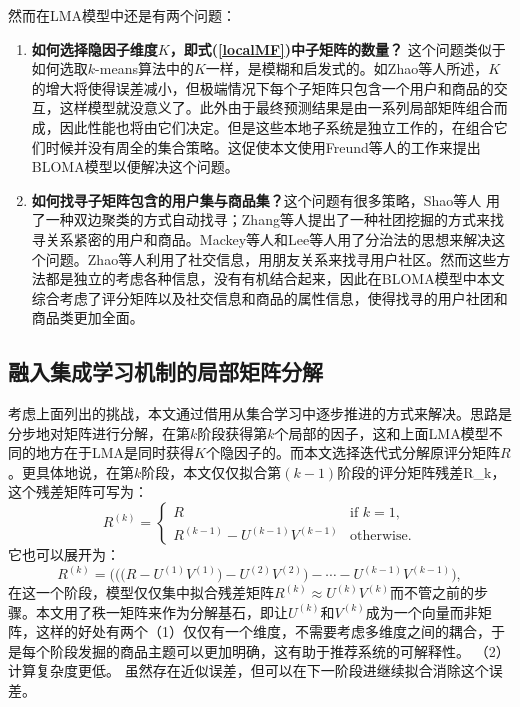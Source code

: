 然而在LMA模型中还是有两个问题：
\begin{enumerate}
\vspace{1.5mm}
\item \textbf{如何选择隐因子维度$K$，即式(\ref{localMF})中子矩阵的数量？} 这个问题类似于如何选取$k$-means算法中的$K$一样，是模糊和启发式的。如Zhao等人所述，$K$的增大将使得误差减小，但极端情况下每个子矩阵只包含一个用户和商品的交互，这样模型就没意义了。此外由于最终预测结果是由一系列局部矩阵组合而成，因此性能也将由它们决定。但是这些本地子系统是独立工作的，在组合它们时候并没有周全的集合策略。这促使本文使用Freund等人的工作来提出BLOMA模型以便解决这个问题。

\vspace{1.5mm}
\item \textbf{如何找寻子矩阵包含的用户集与商品集？}这个问题有很多策略，Shao等人 用了一种双边聚类的方式自动找寻；Zhang等人提出了一种社团挖掘的方式来找寻关系紧密的用户和商品。Mackey等人和Lee等人用了分治法的思想来解决这个问题。Zhao等人利用了社交信息，用朋友关系来找寻用户社区。然而这些方法都是独立的考虑各种信息，没有有机结合起来，因此在BLOMA模型中本文综合考虑了评分矩阵以及社交信息和商品的属性信息，使得找寻的用户社团和商品类更加全面。
\end{enumerate}

\subsection{融入集成学习机制的局部矩阵分解}
考虑上面列出的挑战，本文通过借用从集合学习中逐步推进的方式来解决。思路是分步地对矩阵进行分解，在第$k$阶段获得第$k$个局部的因子，这和上面LMA模型不同的地方在于LMA是同时获得$K$个隐因子的。而本文选择迭代式分解原评分矩阵$R$。更具体地说，在第$k$阶段，本文仅仅拟合第$(k-1)$阶段的评分矩阵残差\gls{R_k}，这个残差矩阵可写为：
\begin{equation}
\label{residue}
R^{(k)} = 
\begin{cases}
R& \text{if } k=1,\\
R^{(k-1)}-U^{(k-1)}V^{(k-1)}& \text{otherwise}.
\end{cases}
\end{equation}
它也可以展开为：
\begin{equation}
\label{unfold}
R^{(k)} = \bigg(\Big(\big(R-U^{(1)}V^{(1)}\big) - U^{(2)}V^{(2)} \Big)-\cdots-U^{(k-1)}V^{(k-1)}\bigg),
\end{equation}
在这一个阶段，模型仅仅集中拟合残差矩阵$R^{(k)} \approx U^{(k)}V^{(k)}$而不管之前的步骤。本文用了秩一矩阵来作为分解基石，即让$U^{(k)}$和$V^{(k)}$成为一个向量而非矩阵，这样的好处有两个（1）仅仅有一个维度，不需要考虑多维度之间的耦合，于是每个阶段发掘的商品主题可以更加明确，这有助于推荐系统的可解释性。
（2）计算复杂度更低。 虽然存在近似误差，但可以在下一阶段进继续拟合消除这个误差。

